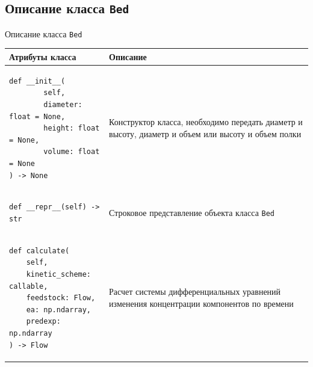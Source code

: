 \documentclass[aspectratio=169, mathserif]{beamer}%
\begin{document}
\subsection{Описание класса \texttt{Bed}}
\begin{frame}[fragile, label=c]{Описание класса \texttt{Bed}}
\scriptsize
\begin{table}[h!]
\centering
\renewcommand{\arraystretch}{1.2}
\begin{tabular}{|p{.49\linewidth}|p{.49\linewidth}|}
	\hline
	\textbf{Атрибуты класса} & \textbf{Описание}  \\
	\hline
\begin{minipage}{\linewidth}
\vfill
\begin{verbatim}
def __init__(
        self,
        diameter: float = None,
        height: float = None,
        volume: float = None
) -> None
\end{verbatim}
\vfill
\end{minipage}
	&
\begin{minipage}{\linewidth}
Конструктор класса, необходимо передать диаметр и высоту, диаметр и объем или высоту и объем полки
\end{minipage}
\\
	\hline
\begin{minipage}{\linewidth}
\vfill
\begin{verbatim}
def __repr__(self) -> str
\end{verbatim}
\vfill
\end{minipage}
		& Строковое представление объекта класса \texttt{Bed} \\
		\hline
\begin{minipage}{\linewidth}
\vfill
\begin{verbatim}
def calculate(
    self,
    kinetic_scheme: callable,
    feedstock: Flow,
    ea: np.ndarray,
    predexp: np.ndarray
) -> Flow
\end{verbatim}
\vfill
\end{minipage}
		&
\begin{minipage}{\linewidth}
Расчет системы дифференциальных уравнений изменения концентрации компонентов по времени
\end{minipage}
\\
		\hline
	\end{tabular}
\end{table}
\vfill
\end{frame}
\end{document}
